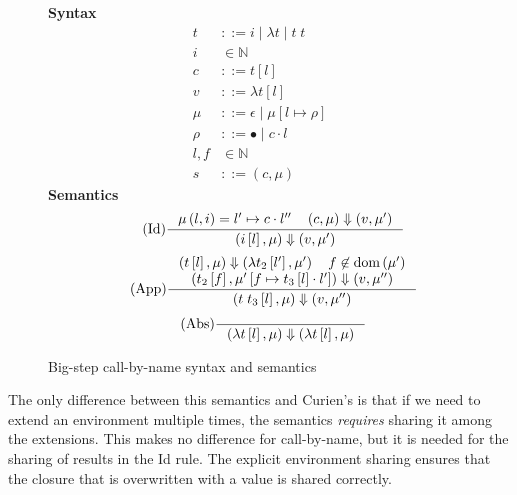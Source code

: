 \begin{figure}
\textbf{Syntax}
\begin{align*}
\tag{Term} t &::= i \; | \; \lambda t \; | \; t \; t  \\
\tag{Variable} i &\in \mathbb{N}  \\
\tag{Closure} c &::= t \left[l\right] \\
\tag{Value} v &::= \lambda t \left[l\right] \\
\tag{Heap} \mu &::= \epsilon \; | \; \mu \left[ l \mapsto \rho \right] \\
\tag{Environment} \rho &::= \bullet \; | \; c \cdot l \\
\tag{Location} l,f &\in \mathbb{N}  \\
\tag{Configuration} s &::= \left(c, \mu \right)
\end{align*}
\textbf{Semantics}
\begin{align*}
\tag{Id} \inference
{\mu \left( l, i \right) = l' \mapsto c \cdot l'' \quad 
 \left(c, \mu\right) \Downarrow \left(v, \mu'\right)}
{\left(i\left[l\right],\mu\right) \Downarrow \left(v, \mu'\right)}
\end{align*} 
\begin{align*}
\tag{App} \inference
{\left(t\left[l\right], \mu\right) \Downarrow \left(\lambda t_2\left[l'\right], \mu'\right) 
   \quad f \not \in \textnormal{dom}\left(\mu'\right)
   \\ \left(t_2\left[f\right], \mu'\left[f \mapsto t_3\left[l\right] \cdot l'\right]\right)
         \Downarrow 
      \left(v, \mu'' \right) 
   }
{\left(t \; t_3\left[l\right], \mu\right) \Downarrow \left(v, \mu'' \right)}  
\end{align*} 
\begin{align*}
\tag{Abs} \inference {} {\left(\lambda t\left[l\right], \mu\right) \Downarrow \left(\lambda t\left[l\right], \mu\right)}
\end{align*}
\caption{Big-step call-by-name \ce syntax and semantics}
\label{fig:bigstepname}
\end{figure}


The only difference between this semantics and Curien's is that if we need
to extend an environment multiple times, the semantics \emph{requires}
sharing it among the extensions. This makes no difference for call-by-name, but
it is needed for the sharing of results in the Id rule. The explicit
environment sharing ensures that the closure that is overwritten with a
value is shared correctly.

